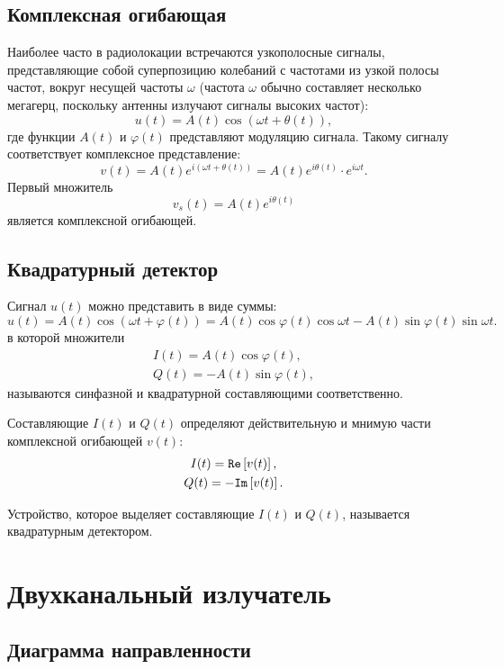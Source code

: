 \subsection{Комплексная огибающая}

Наиболее часто в радиолокации встречаются узкополосные сигналы, представляющие собой суперпозицию колебаний с частотами из узкой полосы частот, вокруг несущей
частоты $\omega$ (частота $\omega$ обычно составляет несколько мегагерц, поскольку антенны излучают сигналы высоких частот):
\[
    u(t) = A(t) \cos ( \omega t + \theta(t) ),
\]
где функции $A(t)$ и $\varphi(t)$ представляют модуляцию сигнала. Такому сигналу соответствует комплексное представление:
\[
    v(t)
    = A(t) e^{i ( \omega t + \theta(t) )}
    = A(t) e^{i \theta(t)} \cdot e^{i \omega t} .
\]
Первый множитель
\[
    v_s(t) = A(t) e^{i \theta(t)}
\]
является комплексной огибающей.

\subsection{Квадратурный детектор}

Сигнал $u(t)$ можно представить в виде суммы:
\[
    u(t)
    = A(t) \cos ( \omega t + \varphi(t) )
    = A(t) \cos \varphi(t) \cos \omega t - A(t) \sin \varphi(t) \sin \omega t .
\]
в которой множители
\begin{gather*}
    I(t) = A(t) \cos \varphi(t) , \\
    Q(t) = - A(t) \sin \varphi(t) ,
\end{gather*}
называются синфазной и квадратурной составляющими соответственно.

Составляющие $I(t)$ и $Q(t)$ определяют действительную и мнимую части комплексной огибающей $v(t)$:
\begin{gather*}
    I(t) = \mathtt{Re} \left [ v(t) \right ] , \\
    Q(t) = - \mathtt{Im} \left [ v(t) \right ] .
\end{gather*}

Устройство, которое выделяет составляющие $I(t)$ и $Q(t)$, называется квадратурным детектором.


\section{Двухканальный излучатель}

\subsection{Диаграмма направленности}

